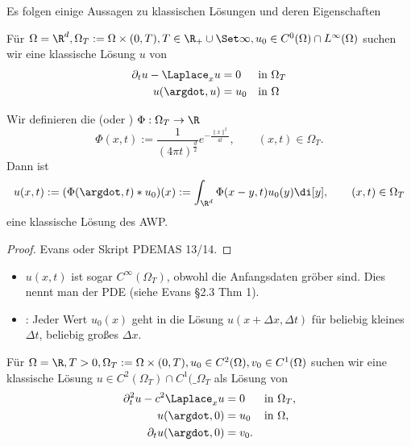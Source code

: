 Es folgen einige Aussagen zu klassischen Lösungen und deren Eigenschaften

\begin{df} \label{1.19}
	Für $\Omega = \R^d, \Omega_T := \Omega \times (0, T), T \in \R_+ \cup \Set \infty, u_0 \in C^0(\Omega) \cap L^\infty(\Omega)$ suchen wir eine klassische Lösung $u$ von
	\begin{align*}
		\partial_t u - \Laplace_x u &= 0  &&\text{in $\Omega_T$}\\
		u(\argdot, u) &= u_0  &&\text{in $\Omega$}
	\end{align*}
\end{df}

\begin{st} \label{2.20}
	Wir definieren die  (oder ) $\Phi: \Omega_T \to \R$
	\[
		\Phi(x,t) := \frac{1}{(4\pi t)^{\frac{d}{2}}} e^{- \frac{\|x\|^2}{4t}},
		\qquad (x,t) \in \Omega_T.
	\]
	Dann ist
	\[
		u(x,t) := (\Phi(\argdot, t) \ast u_0) (x) := \int_{\R^d} \Phi(x-y, t) u_0(y) \di[y],
		\qquad (x,t) \in \Omega_T
	\]
	eine klassische Lösung des AWP.
	\begin{proof}
		Evans oder Skript PDEMAS 13/14.
	\end{proof}
	\begin{note}
		\begin{itemize}
			\item
				$u(x,t)$ ist sogar $C^\infty(\Omega_T)$, obwohl die Anfangsdaten gröber sind.
				Dies nennt man  der PDE (siehe Evans §2.3 Thm 1).
			\item
				: Jeder Wert $u_0(x)$ geht in die Lösung $u(x + \Delta x, \Delta t)$ für beliebig kleines $\Delta t$, beliebig großes $\Delta x$.
		\end{itemize}
	\end{note}
\end{st}

\begin{df}[AWP für Wellengleichung, $d = 1$] \label{1.21}
	Für $\Omega = \R, T > 0, \Omega_T := \Omega \times (0, T), u_0 \in C^2(\Omega), v_0 \in C^1(\Omega)$ suchen wir eine klassische Lösung $u \in C^2(\Omega_T) \cap C^1(\_{\Omega_T}$ als Lösung von
	\begin{align*}
		\partial_t^2 u - c^2 \Laplace_x u &= 0 &&\text{in $\Omega_T$}, \\
		u(\argdot, 0) &= u_0  && \text{in $\Omega$}, \\
		\partial_t u(\argdot, 0) &= v_0.
	\end{align*}
\end{df}

